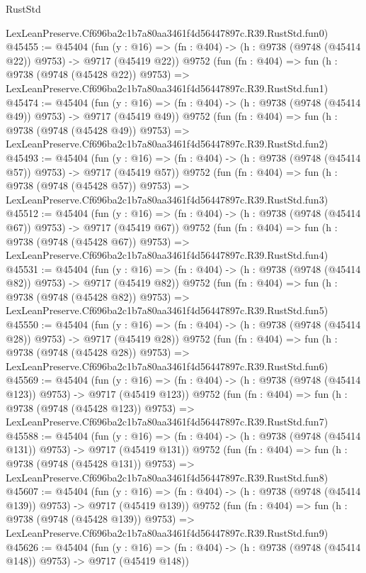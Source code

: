 \begin{lexlean}{RustStd}
\begin{coremodule}
    LexLeanPreserve.Cf696ba2c1b7a80aa3461f4d56447897c.R39.RustStd.fun0)
@45455 := @45404
    (fun (y : @16) => (fn : @404) -> (h : @9738 (@9748 (@45414 @22)) @9753) -> @9717 (@45419 @22))
    @9752
    (fun (fn : @404) =>
    fun (h : @9738 (@9748 (@45428 @22)) @9753) =>
    LexLeanPreserve.Cf696ba2c1b7a80aa3461f4d56447897c.R39.RustStd.fun1)
@45474 := @45404
    (fun (y : @16) => (fn : @404) -> (h : @9738 (@9748 (@45414 @49)) @9753) -> @9717 (@45419 @49))
    @9752
    (fun (fn : @404) =>
    fun (h : @9738 (@9748 (@45428 @49)) @9753) =>
    LexLeanPreserve.Cf696ba2c1b7a80aa3461f4d56447897c.R39.RustStd.fun2)
@45493 := @45404
    (fun (y : @16) => (fn : @404) -> (h : @9738 (@9748 (@45414 @57)) @9753) -> @9717 (@45419 @57))
    @9752
    (fun (fn : @404) =>
    fun (h : @9738 (@9748 (@45428 @57)) @9753) =>
    LexLeanPreserve.Cf696ba2c1b7a80aa3461f4d56447897c.R39.RustStd.fun3)
@45512 := @45404
    (fun (y : @16) => (fn : @404) -> (h : @9738 (@9748 (@45414 @67)) @9753) -> @9717 (@45419 @67))
    @9752
    (fun (fn : @404) =>
    fun (h : @9738 (@9748 (@45428 @67)) @9753) =>
    LexLeanPreserve.Cf696ba2c1b7a80aa3461f4d56447897c.R39.RustStd.fun4)
@45531 := @45404
    (fun (y : @16) => (fn : @404) -> (h : @9738 (@9748 (@45414 @82)) @9753) -> @9717 (@45419 @82))
    @9752
    (fun (fn : @404) =>
    fun (h : @9738 (@9748 (@45428 @82)) @9753) =>
    LexLeanPreserve.Cf696ba2c1b7a80aa3461f4d56447897c.R39.RustStd.fun5)
@45550 := @45404
    (fun (y : @16) => (fn : @404) -> (h : @9738 (@9748 (@45414 @28)) @9753) -> @9717 (@45419 @28))
    @9752
    (fun (fn : @404) =>
    fun (h : @9738 (@9748 (@45428 @28)) @9753) =>
    LexLeanPreserve.Cf696ba2c1b7a80aa3461f4d56447897c.R39.RustStd.fun6)
@45569 := @45404
    (fun (y : @16) => (fn : @404) -> (h : @9738 (@9748 (@45414 @123)) @9753) -> @9717 (@45419 @123))
    @9752
    (fun (fn : @404) =>
    fun (h : @9738 (@9748 (@45428 @123)) @9753) =>
    LexLeanPreserve.Cf696ba2c1b7a80aa3461f4d56447897c.R39.RustStd.fun7)
@45588 := @45404
    (fun (y : @16) => (fn : @404) -> (h : @9738 (@9748 (@45414 @131)) @9753) -> @9717 (@45419 @131))
    @9752
    (fun (fn : @404) =>
    fun (h : @9738 (@9748 (@45428 @131)) @9753) =>
    LexLeanPreserve.Cf696ba2c1b7a80aa3461f4d56447897c.R39.RustStd.fun8)
@45607 := @45404
    (fun (y : @16) => (fn : @404) -> (h : @9738 (@9748 (@45414 @139)) @9753) -> @9717 (@45419 @139))
    @9752
    (fun (fn : @404) =>
    fun (h : @9738 (@9748 (@45428 @139)) @9753) =>
    LexLeanPreserve.Cf696ba2c1b7a80aa3461f4d56447897c.R39.RustStd.fun9)
@45626 := @45404
    (fun (y : @16) => (fn : @404) -> (h : @9738 (@9748 (@45414 @148)) @9753) -> @9717 (@45419 @148))

\end{coremodule}
\end{lexlean}

